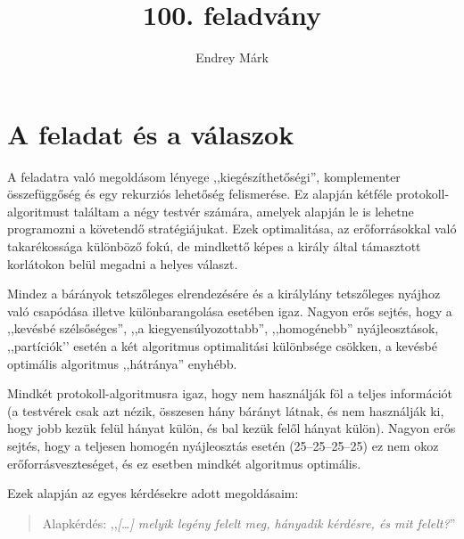 \documentclass{article}
\title{100. feladvány}
\author{Endrey Márk}
\begin{document}
	\maketitle

	\tableofcontents

	\section{A feladat és a válaszok}

	A feladatra való megoldásom lényege ,,kiegészíthetőségi'', komplementer összefüggőség és egy rekurziós lehetőség felismerése. Ez alapján kétféle protokoll-algoritmust találtam a négy testvér számára, amelyek alapján le is lehetne programozni a követendő stratégiájukat.
	Ezek optimalitása, az erőforrásokkal való takarékossága különböző fokú, de mindkettő képes a király által támasztott korlátokon belül megadni a helyes választ.

	Mindez a bárányok tetszőleges elrendezésére és a királylány tetszőleges nyájhoz való csapódása illetve különbarangolása esetében igaz.
	Nagyon erős sejtés, hogy a ,,kevésbé szélsőséges'', ,,a kiegyensúlyozottabb'', ,,homogénebb'' nyájleosztások, ,,partíciók’’ esetén a két algoritmus optimalitási különbsége csökken, a kevésbé optimális algoritmus ,,hátránya'' enyhébb.

	Mindkét protokoll-algoritmusra igaz, hogy nem használják föl a teljes információt (a testvérek csak azt nézik, összesen hány bárányt látnak, és nem használják ki, hogy jobb kezük felül hányat külön, és bal kezük felől hányat külön). Nagyon erős sejtés, hogy a teljesen homogén nyájleosztás esetén (25--25--25--25) ez nem okoz erőforrásveszteséget, és ez esetben mindkét algoritmus optimális.

	Ezek alapján az egyes  kérdésekre adott megoldásaim:

	\begin{quotation}
		Alapkérdés: ,,\textit{[\dots] melyik legény felelt meg, hányadik kérdésre, és mit felelt?}''
	\end{quotation}
\end{document}

